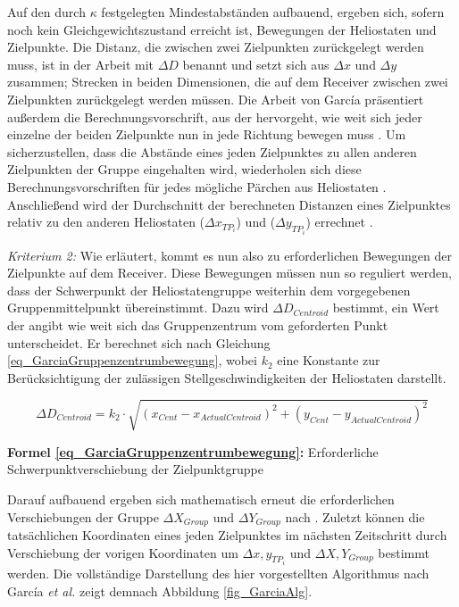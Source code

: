 Auf den durch $\kappa$ festgelegten Mindestabständen aufbauend, ergeben sich, sofern noch kein Gleichgewichtszustand erreicht ist, Bewegungen der Heliostaten und Zielpunkte.
Die Distanz, die zwischen zwei Zielpunkten zurückgelegt werden muss, ist in der Arbeit mit $\Delta D$ benannt und setzt sich aus $\Delta x$ und $\Delta y$ zusammen; Strecken in beiden Dimensionen, die auf dem Receiver zwischen zwei Zielpunkten zurückgelegt werden müssen.
Die Arbeit von García präsentiert außerdem die Berechnungsvorschrift, aus der hervorgeht, wie weit sich jeder einzelne der beiden Zielpunkte nun in jede Richtung bewegen muss \cite[S. 9-10]{Garcia2}.
Um sicherzustellen, dass die Abstände eines jeden Zielpunktes zu allen anderen Zielpunkten der Gruppe eingehalten wird, wiederholen sich diese Berechnungsvorschriften für jedes mögliche Pärchen aus Heliostaten \cite[S. 9]{Garcia2}.
Anschließend wird der Durchschnitt der berechneten Distanzen eines Zielpunktes relativ zu den anderen Heliostaten ($\Delta x_{TP_i}$) und ($\Delta y_{TP_i}$) errechnet \cite[S. 10]{Garcia2}.


\textit{Kriterium 2:}
Wie erläutert, kommt es nun also zu erforderlichen Bewegungen der Zielpunkte auf dem Receiver.
Diese Bewegungen müssen nun so reguliert werden, dass der Schwerpunkt der Heliostatengruppe weiterhin dem vorgegebenen Gruppenmittelpunkt übereinstimmt.
Dazu wird $\Delta D_{Centroid}$ bestimmt, ein Wert der angibt wie weit sich das Gruppenzentrum vom geforderten Punkt unterscheidet.
Er berechnet sich nach Gleichung \ref{eq_GarciaGruppenzentrumbewegung}, wobei $k_2$ eine Konstante zur Berücksichtigung der zulässigen Stellgeschwindigkeiten der Heliostaten darstellt.

\begin{equation} \label{eq_GarciaGruppenzentrumbewegung}
    \Delta D_{Centroid} = k_2 \cdot \sqrt{\left(x_{Cent}-x_{Actual Centroid}\right)^2+\left(y_{Cent}-y_{Actual Centroid}\right)^2}
\end{equation}
\centerline{\small{\textsf{\textbf{Formel \ref{eq_GarciaGruppenzentrumbewegung}:}} Erforderliche Schwerpunktverschiebung der Zielpunktgruppe}}

Darauf aufbauend ergeben sich mathematisch erneut die erforderlichen Verschiebungen der Gruppe $\Delta X_{Group}$ und $\Delta Y_{Group}$ nach \cite[S. 10]{Garcia2}.
Zuletzt können die tatsächlichen Koordinaten eines jeden Zielpunktes im nächsten Zeitschritt durch Verschiebung der vorigen Koordinaten um $\Delta x,y_{TP_i}$ und $\Delta X,Y_{Group}$ bestimmt werden.
Die vollständige Darstellung des hier vorgestellten Algorithmus nach García \textit{et al.} \cite{Garcia2} zeigt demnach Abbildung \ref{fig_GarciaAlg}.

